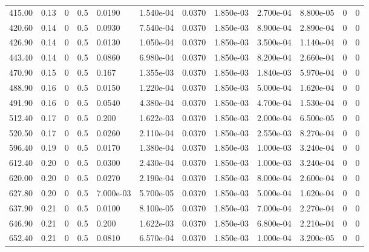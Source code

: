 \documentclass[preview]{standalone}
\begin{document}
{{\begin{tabular}{L{1.2cm}C{1.2cm} C{0.3cm}C{0.5cm} C{1.4cm}C{1.4cm} C{1.4cm}C{1.4cm} C{1.6cm}C{1.6cm} C{1.6cm}C{1.6cm}}
  415.00  &  0.13  & 0     & 0.5 &  0.0190  & 1.540e-04  &  0.0370&   1.850e-03& 2.700e-04 & 8.800e-05   &  0 & 0  \\ 
  420.60  &  0.14  & 0     & 0.5 &  0.0930  & 7.540e-04  &  0.0370&   1.850e-03& 8.900e-04 & 2.890e-04   &  0 & 0  \\ 
  426.90  &  0.14  & 0     & 0.5 &  0.0130  & 1.050e-04  &  0.0370&   1.850e-03& 3.500e-04 & 1.140e-04   &  0 & 0  \\ 
  443.40  &  0.14  & 0     & 0.5 &  0.0860  & 6.980e-04  &  0.0370&   1.850e-03& 8.200e-04 & 2.660e-04   &  0 & 0  \\ 
  470.90  &  0.15  & 0     & 0.5 &  0.167  & 1.355e-03  &  0.0370&   1.850e-03& 1.840e-03 & 5.970e-04   &  0 & 0  \\ 
  488.90  &  0.16  & 0     & 0.5 &  0.0150  & 1.220e-04  &  0.0370&   1.850e-03& 5.000e-04 & 1.620e-04   &  0 & 0  \\ 
  491.90  &  0.16  & 0     & 0.5 &  0.0540  & 4.380e-04  &  0.0370&   1.850e-03& 4.700e-04 & 1.530e-04   &  0 & 0  \\ 
  512.40  &  0.17  & 0     & 0.5 &  0.200  & 1.622e-03  &  0.0370&   1.850e-03& 2.000e-04 & 6.500e-05   &  0 & 0  \\ 
  520.50  &  0.17  & 0     & 0.5 &  0.0260  & 2.110e-04  &  0.0370&   1.850e-03& 2.550e-03 & 8.270e-04   &  0 & 0  \\ 
  596.40  &  0.19  & 0     & 0.5 &  0.0170  & 1.380e-04  &  0.0370&   1.850e-03& 1.000e-03 & 3.240e-04   &  0 & 0  \\ 
  612.40  &  0.20  & 0     & 0.5 &  0.0300  & 2.430e-04  &  0.0370&   1.850e-03& 1.000e-03 & 3.240e-04   &  0 & 0  \\ 
  620.00  &  0.20  & 0     & 0.5 &  0.0270  & 2.190e-04  &  0.0370&   1.850e-03& 8.000e-04 & 2.600e-04   &  0 & 0  \\ 
  627.80  &  0.20  & 0     & 0.5 &  7.000e-03  & 5.700e-05  &  0.0370&   1.850e-03& 5.000e-04 & 1.620e-04   &  0 & 0  \\ 
  637.90  &  0.21  & 0     & 0.5 &  0.0100  & 8.100e-05  &  0.0370&   1.850e-03& 7.000e-04 & 2.270e-04   &  0 & 0  \\ 
  646.90  &  0.21  & 0     & 0.5 &  0.200  & 1.622e-03  &  0.0370&   1.850e-03& 6.800e-04 & 2.210e-04   &  0 & 0  \\ 
  652.40  &  0.21  & 0     & 0.5 &  0.0810  & 6.570e-04  &  0.0370&   1.850e-03& 1.000e-04 & 3.200e-05   &  0 & 0  \\ 
\hline 
\end{tabular} 

}}
\end{document}
